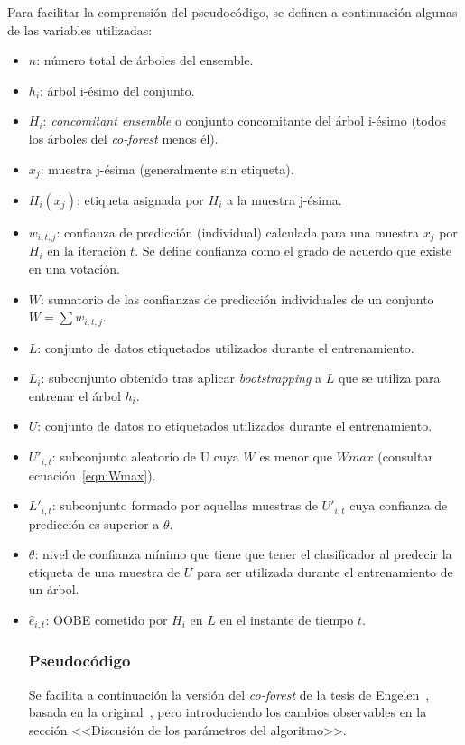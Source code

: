 Para facilitar la comprensión del pseudocódigo, se definen a continuación algunas de las variables utilizadas:
\begin{itemize}
	\item $n$: número total de árboles del ensemble.
	\item $h_{i}$: árbol i-ésimo del conjunto.
	\item $H_{i}$: \textit{concomitant ensemble} o conjunto concomitante del árbol i-ésimo (todos los árboles del \textit{co-forest} menos él).
	\item $x_j$: muestra j-ésima (generalmente sin etiqueta).
	\item $H_i(x_j)$: etiqueta asignada por $H_i$ a la muestra j-ésima.
	\item $w_{i,t,j}$: confianza de predicción (individual) calculada para una muestra $x_j$ por $H_{i}$ en la iteración $t$. Se define confianza como el grado de acuerdo que existe en una votación. 
	\item $W$: sumatorio de las confianzas de predicción individuales de un conjunto $W = \sum w_{i,t,j}$.
	\item $L$: conjunto de datos etiquetados utilizados durante el entrenamiento.
	\item $L_{i}$: subconjunto obtenido tras aplicar \textit{bootstrapping} a $L$ que se utiliza para entrenar el árbol $h_{i}$.
	\item $U$: conjunto de datos no etiquetados utilizados durante el entrenamiento.
	\item $U'_{i,t}$: subconjunto aleatorio de U cuya $W$ es menor que $Wmax$ (consultar ecuación~\ref{eqn:Wmax}).
	\item $L'_{i,t}$: subconjunto formado por aquellas muestras de $U'_{i,t}$ cuya confianza de predicción es superior a $\theta$.
	\item $\theta$: nivel de confianza mínimo que tiene que tener el clasificador al predecir la etiqueta de una muestra de $U$ para ser utilizada durante el entrenamiento de un árbol.
	\item $\hat{e}_{i,t}$: OOBE cometido por $H_{i}$ en $L$ en el instante de tiempo $t$.

\subsubsection{Pseudocódigo}

Se facilita a continuación la versión del \textit{co-forest} de la tesis de Engelen~\cite{engelen2018thesis}, basada en la original~\cite{originalCoForest2007}, pero introduciendo los cambios observables en la sección <<Discusión de los parámetros del algoritmo>>.


\end{itemize}
